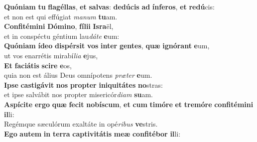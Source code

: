 \evenverse \textbf{Quó}\textbf{ni}\textbf{am} \textbf{tu} \textbf{fla}\textbf{gél}\textbf{las}, \textbf{et} \textbf{sal}\textbf{vas}: \textbf{de}\textbf{dú}\textbf{cis} \textbf{ad} \textbf{ín}\textbf{fe}\textbf{ros}, \textbf{et} \textbf{re}\textbf{dú}cis:~\*\\
\evenverse et non est qui effúgiat \textit{ma}\textit{num} \textbf{tu}am.\\
\oddverse \textbf{Con}\textbf{fi}\textbf{té}\textbf{mi}\textbf{ni} \textbf{Dó}\textbf{mi}\textbf{no}, \textbf{fí}\textbf{li}\textbf{i} \textbf{Is}\textbf{ra}ël,~\*\\
\oddverse et in conspéctu géntium lau\textit{dá}\textit{te} \textbf{e}um:\\
\evenverse \textbf{Quó}\textbf{ni}\textbf{am} \textbf{í}\textbf{de}\textbf{o} \textbf{di}\textbf{spér}\textbf{sit} \textbf{vos} \textbf{in}\textbf{ter} \textbf{gen}\textbf{tes}, \textbf{quæ} \textbf{i}\textbf{gnó}\textbf{rant} \textbf{e}um,~\*\\
\evenverse ut vos enarrétis mirabí\textit{li}\textit{a} \textbf{e}jus,\\
\oddverse \textbf{Et} \textbf{fa}\textbf{ci}\textbf{á}\textbf{tis} \textbf{sci}\textbf{re} \textbf{e}os,~\*\\
\oddverse quia non est álius Deus omnípotens \textit{præ}\textit{ter} \textbf{e}um.\\
\evenverse \textbf{I}\textbf{pse} \textbf{ca}\textbf{sti}\textbf{gá}\textbf{vit} \textbf{nos} \textbf{prop}\textbf{ter} \textbf{i}\textbf{ni}\textbf{qui}\textbf{tá}\textbf{tes} \textbf{no}stras:~\*\\
\evenverse et ipse salvábit nos propter misericór\textit{di}\textit{am} \textbf{su}am.\\
\oddverse \textbf{A}\textbf{spí}\textbf{ci}\textbf{te} \textbf{er}\textbf{go} \textbf{quæ} \textbf{fe}\textbf{cit} \textbf{no}\textbf{bí}\textbf{scum}, \textbf{et} \textbf{cum} \textbf{ti}\textbf{mó}\textbf{re} \textbf{et} \textbf{tre}\textbf{mó}\textbf{re} \textbf{con}\textbf{fi}\textbf{té}\textbf{mi}\textbf{ni} \textbf{il}li:~\*\\
\oddverse Regémque sæculórum exaltáte in opé\textit{ri}\textit{bus} \textbf{ve}stris.\\
\evenverse \textbf{E}\textbf{go} \textbf{au}\textbf{tem} \textbf{in} \textbf{ter}\textbf{ra} \textbf{cap}\textbf{ti}\textbf{vi}\textbf{tá}\textbf{tis} \textbf{me}\textbf{æ} \textbf{con}\textbf{fi}\textbf{té}\textbf{bor} \textbf{il}li:~\*\\
